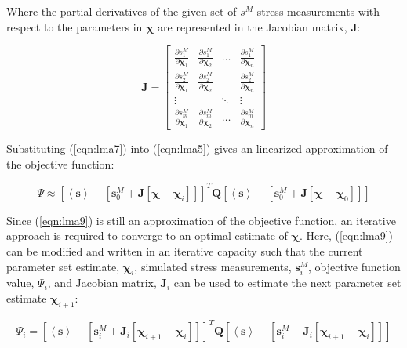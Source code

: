Where the partial derivatives of the given set of $s^M$ stress measurements with respect to the parameters in $\boldsymbol{\chi}$ are represented in the Jacobian matrix, $\mathbf{J}$: 

\begin{equation}
\mathbf{J}=\begin{bmatrix}
\frac{\partial s^M_1}{\partial \boldsymbol{\chi}_1} & \frac{\partial s^M_1}{\partial \boldsymbol{\chi}_2}     & \dots  & \frac{\partial s^M_1}{\partial \boldsymbol{\chi}_n}\\ 
\frac{\partial s^M_2}{\partial \boldsymbol{\chi}_1}     & \frac{\partial s^M_2}{\partial \boldsymbol{\chi}_2} &        & \frac{\partial s^M_2}{\partial \boldsymbol{\chi}_n}\\ 
\vdots&       & \ddots & \vdots \\ 
\frac{\partial s^M_m}{\partial \boldsymbol{\chi}_1}     & \frac{\partial s^M_m}{\partial \boldsymbol{\chi}_2}     & \dots  & \frac{\partial s^M_m}{\partial \boldsymbol{\chi}_n}
\end{bmatrix}
\label{eqn:lma8}
\end{equation}

Substituting (\ref{eqn:lma7}) into (\ref{eqn:lma5}) gives an linearized approximation of the objective function:

\begin{equation}
\Psi\approx\left[\left<\mathbf{s}\right>-\left[\mathbf{s}^M_0 + \mathbf{J} \left[ \boldsymbol{\chi}-\boldsymbol{\chi}_i \right] \right]\right]^T \mathbf{Q} \left[\left<\mathbf{s}\right>-\left[\mathbf{s}^M_0 + \mathbf{J} \left[ \boldsymbol{\chi}-\boldsymbol{\chi}_0 \right]\right]\right]
\label{eqn:lma9}
\end{equation}

Since (\ref{eqn:lma9}) is still an approximation of the objective function, an iterative approach is required to converge to an optimal estimate of $\boldsymbol{\chi}$. Here, (\ref{eqn:lma9}) can be modified and written in an iterative capacity such that the current parameter set estimate, $\boldsymbol{\chi}_i$, simulated stress measurements, $\mathbf{s}^M_i$, objective function value, $\Psi_i$, and Jacobian matrix, $\mathbf{J}_i$ can be used to estimate the next parameter set estimate $\boldsymbol{\chi}_{i+1}$:

\begin{equation}
\Psi_{i}=\left[\left<\mathbf{s}\right>-\left[\mathbf{s}^M_i + \mathbf{J}_i \left[ \boldsymbol{\chi}_{i+1}-\boldsymbol{\chi}_i \right] \right]\right]^T \mathbf{Q} \left[\left<\mathbf{s}\right>-\left[\mathbf{s}^M_i + \mathbf{J}_i \left[ \boldsymbol{\chi}_{i+1}-\boldsymbol{\chi}_i \right]\right]\right]
\label{eqn:lma9a}
\end{equation}


